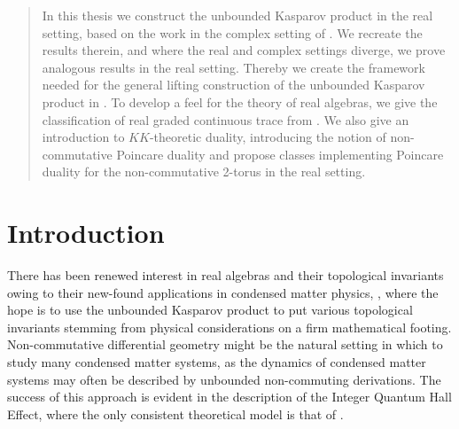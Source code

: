 \begin{abstract}
	In this thesis we construct the unbounded Kasparov product in the real setting, based on the work in the complex setting of \cite{mesrennie}. We recreate the results therein, and where the real and complex settings diverge, we prove analogous results in the real setting. Thereby we create the framework needed for the general lifting construction of the unbounded Kasparov product in \cite[Section 4]{mesrennie}.
	To develop a feel for the theory of real \Cstar algebras, we give the classification of real graded continuous trace from \cite{moutou}.   We also give an introduction to $KK$-theoretic duality, introducing the notion of non-commutative Poincare duality and propose classes implementing Poincare duality for the non-commutative 2-torus in the real setting.
\end{abstract}
\section*{Introduction}
There has been renewed interest in real \Cstar algebras and their topological invariants owing to their new-found applications in condensed matter physics, \cite{bourne}, where the hope is to use the unbounded Kasparov product to put various topological invariants stemming from physical considerations on a firm mathematical footing. Non-commutative differential geometry might be the natural setting in which to study many condensed matter systems, as the dynamics of condensed matter systems may often be described by unbounded non-commuting derivations. The success of this approach is evident in the description of the Integer Quantum Hall Effect, where the only consistent theoretical model is that of \cite{bellissard}.

